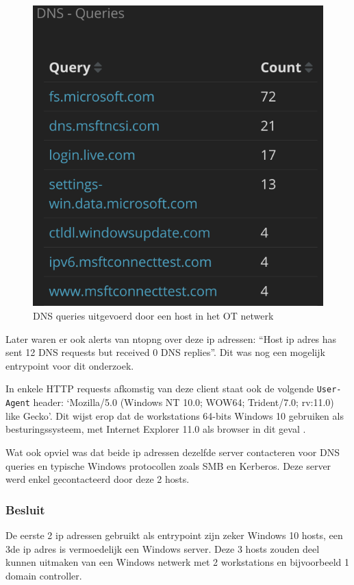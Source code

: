 \documentclass[a4paper,12pt]{report}
\begin{document}
\begin{figure}[H]
  \centering
  \includegraphics[width=\textwidth]{analyse-ot-windows-hosts-dns}
  \caption{DNS queries uitgevoerd door een host in het OT netwerk}
  \label{fig:analyse-ot-windows-hosts-dns}
\end{figure}

Later waren er ook alerts van ntopng over deze ip adressen: ``Host {ip adres} has sent 12 DNS requests but received 0 DNS replies''.
Dit was nog een mogelijk entrypoint voor dit onderzoek.

In enkele HTTP requests afkomstig van deze client staat ook de volgende \lstinline|User-Agent| header: `Mozilla/5.0 (Windows NT 10.0; WOW64; Trident/7.0; rv:11.0) like Gecko'.
Dit wijst erop dat de workstations 64-bits Windows 10 gebruiken als besturingssysteem, met Internet Explorer 11.0 als browser in dit geval \autocite{user-agent-databases:win10ie}.

Wat ook opviel was dat beide ip adressen dezelfde server contacteren voor DNS queries en typische Windows protocollen zoals SMB en Kerberos.
Deze server werd enkel gecontacteerd door deze 2 hosts. 

\subsubsection{Besluit}
De eerste 2 ip adressen gebruikt als entrypoint zijn zeker Windows 10 hosts, een 3de ip adres is vermoedelijk een Windows server.
Deze 3 hosts zouden deel kunnen uitmaken van een Windows netwerk met 2 workstations en bijvoorbeeld 1 domain controller.
\end{document}
